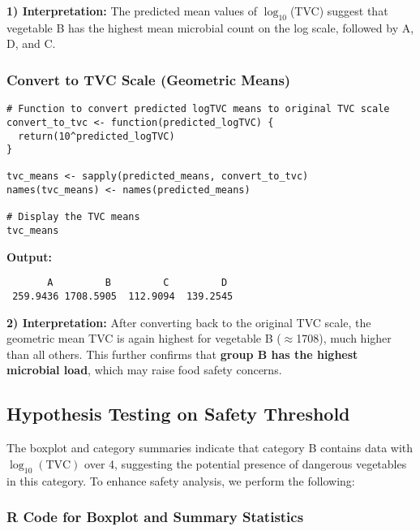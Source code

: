 \documentclass{article}
\begin{document}
\vspace{0.5em}
\noindent\textbf{1) Interpretation:} The predicted mean values of $\log_{10}$(TVC) suggest that vegetable B has the highest mean microbial count on the log scale, followed by A, D, and C.

\vspace{1em}
\subsubsection*{Convert to TVC Scale (Geometric Means)}
\begin{verbatim}
# Function to convert predicted logTVC means to original TVC scale
convert_to_tvc <- function(predicted_logTVC) {
  return(10^predicted_logTVC)
}

tvc_means <- sapply(predicted_means, convert_to_tvc)
names(tvc_means) <- names(predicted_means)

# Display the TVC means
tvc_means
\end{verbatim}

\textbf{Output:}
\begin{verbatim}
       A         B         C         D 
 259.9436 1708.5905  112.9094  139.2545 
\end{verbatim}

\vspace{0.5em}
\noindent\textbf{2) Interpretation:} After converting back to the original TVC scale, the geometric mean TVC is again highest for vegetable B ($\approx$1708), much higher than all others. This further confirms that \textbf{group B has the highest microbial load}, which may raise food safety concerns.


\subsection*{Hypothesis Testing on Safety Threshold }

The boxplot and category summaries indicate that category B contains data with $\log_{10}(\text{TVC})$ over 4, suggesting the potential presence of dangerous vegetables in this category. To enhance safety analysis, we perform the following:

\subsubsection*{R Code for Boxplot and Summary Statistics}
\end{document}

